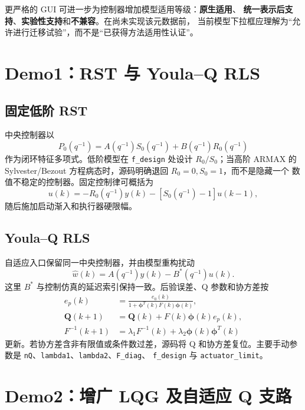 \documentclass[UTF8,11pt,a4paper]{ctexart}
\begin{document}
更严格的 GUI 可进一步为控制器增加模型适用等级：\textbf{原生适用}、
\textbf{统一表示后支持}、\textbf{实验性支持}和\textbf{不兼容}。在尚未实现该元数据前，
当前模型下拉框应理解为“允许进行迁移试验”，而不是“已获得方法适用性认证”。

\section{Demo1：RST 与 Youla--Q RLS}

\subsection{固定低阶 RST}

中央控制器以
\begin{equation}
  P_0(q^{-1})=A(q^{-1})S_0(q^{-1})+B(q^{-1})R_0(q^{-1})
\end{equation}
作为闭环特征多项式。低阶模型在 \texttt{f\_design} 处设计 $R_0/S_0$；当高阶
ARMAX 的 Sylvester/Bezout 方程病态时，源码明确退回 $R_0=0,S_0=1$，而不是隐藏一个
数值不稳定的控制器。固定控制律可概括为
\begin{equation}
u(k)=-R_0(q^{-1})y(k)-[S_0(q^{-1})-1]u(k-1),
\end{equation}
随后施加启动渐入和执行器硬限幅。

\subsection{Youla--Q RLS}

自适应入口保留同一中央控制器，并由模型重构扰动
\begin{equation}
  \hat w(k)=A(q^{-1})y(k)-B^*(q^{-1})u(k).
\end{equation}
这里 $B^*$ 与控制仿真的延迟索引保持一致。后验误差、Q 参数和协方差按
\begin{align}
e_p(k)&=\frac{e_0(k)}{1+\bm\phi^T(k)F(k)\bm\phi(k)},\\
\bm Q(k+1)&=\bm Q(k)+F(k)\bm\phi(k)e_p(k),\\
F^{-1}(k+1)&=\lambda_1F^{-1}(k)+\lambda_2\bm\phi(k)\bm\phi^T(k)
\end{align}
更新。若协方差含非有限值或条件数过差，源码将 Q 和协方差复位。主要手动参数是
\texttt{nQ}、\texttt{lambda1}、\texttt{lambda2}、\texttt{F\_diag}、
\texttt{f\_design} 与 \texttt{actuator\_limit}。

\section{Demo2：增广 LQG 及自适应 Q 支路}
\end{document}
